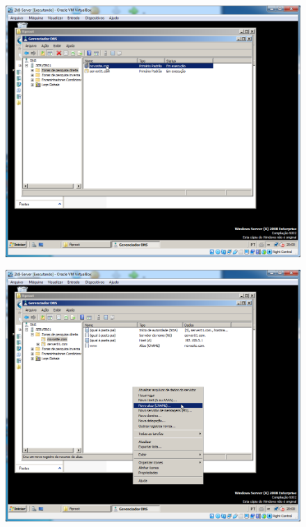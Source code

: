 \documentclass[10pt]{article}
\begin{document}
\begin{figure}[H]
    \centering
    \caption{}
    \label{fig:5415}
    \includegraphics[width=\linewidth]{images/windows_server/ftp/008.png}
\end{figure}
\begin{figure}[H]
    \centering
    \caption{}
    \label{fig:5416}
    \includegraphics[width=\linewidth]{images/windows_server/ftp/009.png}
\end{figure}
\end{document}
